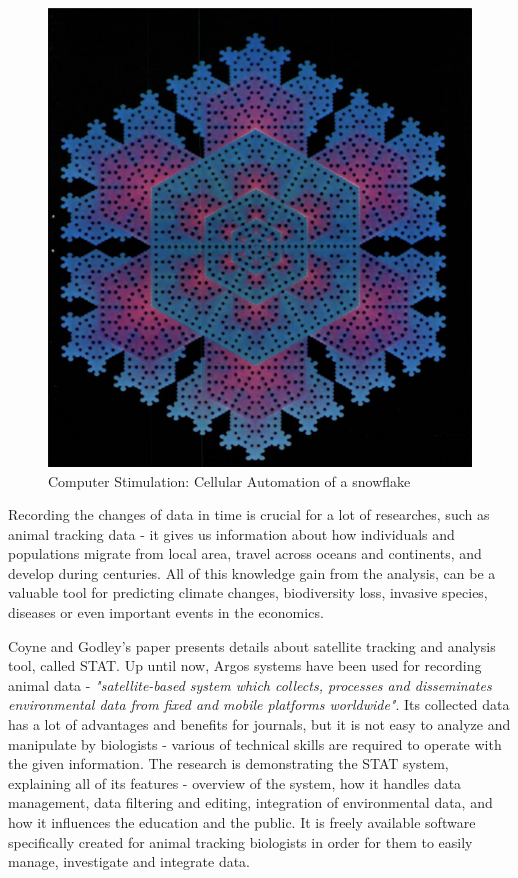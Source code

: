 \begin{figure}[h]
\centering
\includegraphics[scale=0.2]{images/snowflake_algorithm}
\caption{Computer Stimulation: Cellular Automation of a snowflake}
\label{fig:snowflake}
\end{figure}

Recording the changes of data in time is crucial for a lot of researches, such as animal tracking data - it gives us information about how individuals and populations migrate from local area, travel across oceans and continents, and develop during centuries. All of this knowledge gain from the analysis, can be a valuable tool for predicting climate changes, biodiversity loss, invasive species, diseases or even important events in the economics. \cite{coyne2005satellite}

Coyne and Godley's paper \cite{coyne2005satellite} presents details about satellite tracking and analysis tool, called STAT. Up until now, Argos systems have been used for recording animal data - \textit{"satellite-based system which collects, processes and disseminates environmental data from fixed and mobile platforms worldwide"}.\cite{argosWiki} Its collected data has a lot of advantages and benefits for journals, but it is not easy to analyze and manipulate by biologists - various of technical skills are required to operate with the given information. The research is demonstrating the STAT system, explaining all of its features - overview of the system, how it handles data management, data filtering and editing, integration of environmental data, and how it influences the education and the public. It is freely available software specifically created for animal tracking biologists in order for them to easily manage, investigate and integrate data. 


